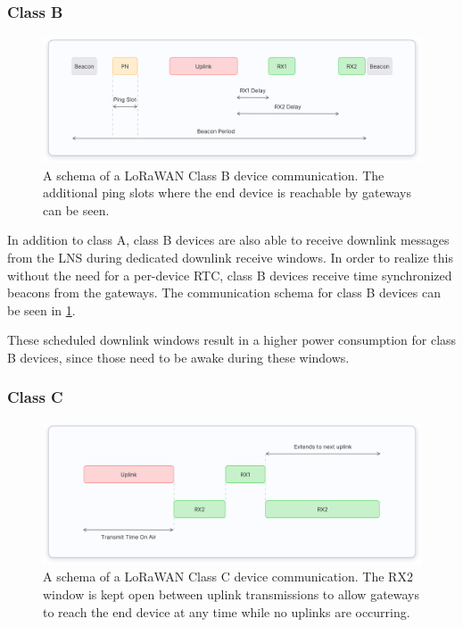 \subsubsection{Class B}

\begin{figure}[htbp]
    \centering
    \includegraphics[width=1\textwidth]{pictures/device-classes/class-b.png}
    \caption{
        A schema of a \ac{LoRaWAN} Class B device communication.
        The additional ping slots where the end device is reachable by gateways can be seen.~\protect\cite{the_things_industries_bv_device_nodate}
    }\label{pic:lorawan-device-class-b-schema}
\end{figure}

In addition to class A, class B devices are also able to receive downlink messages from the \ac{LNS} during dedicated downlink receive windows.
In order to realize this without the need for a per-device \ac{RTC}, class B devices receive time synchronized beacons from the gateways.
The communication schema for class B devices can be seen in \cref{pic:lorawan-device-class-b-schema}.

These scheduled downlink windows result in a higher power consumption for class B devices, since those need to be awake during these windows.

\subsubsection{Class C}

\begin{figure}[htbp]
    \centering
    \includegraphics[width=1\textwidth]{pictures/device-classes/class-c.png}
    \caption{
        A schema of a \ac{LoRaWAN} Class C device communication.
        The RX2 window is kept open between uplink transmissions to allow gateways to reach the end device at any time while no uplinks are occurring.~\protect\cite{the_things_industries_bv_device_nodate}
    }\label{pic:lorawan-device-class-c-schema}
\end{figure}

